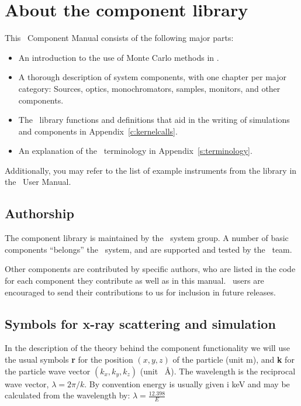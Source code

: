 \chapter{About the component library}
\label{c:components}
This \MCX\ Component Manual consists of the following major parts:
\begin{itemize}
\item An introduction to the use of Monte Carlo methods in \MCX .
\item A thorough description of system components,
with one chapter per major category: Sources, optics,
monochromators, samples, monitors, and other components.
\item The \MCX\ library functions and definitions
  that aid in the writing of simulations and components in
  Appendix~\ref{c:kernelcalls}.
\item An explanation of the \MCX\ terminology in Appendix~\ref{s:terminology}.
\end{itemize}
Additionally, you may refer to the list of example instruments
from the library in the \MCX\ User Manual.

\section{Authorship}
The component library is
maintained by the \MCX\ system group. A number of basic components
``belongs'' the \MCX\ system, and are supported and tested by the \MCX\
team.

Other components are contributed
by specific authors, who are listed in the code for each component
they contribute as well as in this manual.
\MCX\ users are encouraged to send their
contributions to us for inclusion in future releases.


\section{Symbols for x-ray scattering and simulation}
In the description of the theory behind the component functionality
we will use the usual symbols {\bfseries r} for the position
$(x,y,z)$ of the particle (unit m), and {\bfseries k} for
the particle wave vector $(k_x, k_y, k_z)$ (unit \si{\per\angstrom}).
The wavelength is the reciprocal wave vector,
$\lambda=2 \pi / k$. By convention energy is usually given i \si{keV} and may be calculated from the wavelength by:
$\lambda=\frac{12.398}{E}$

